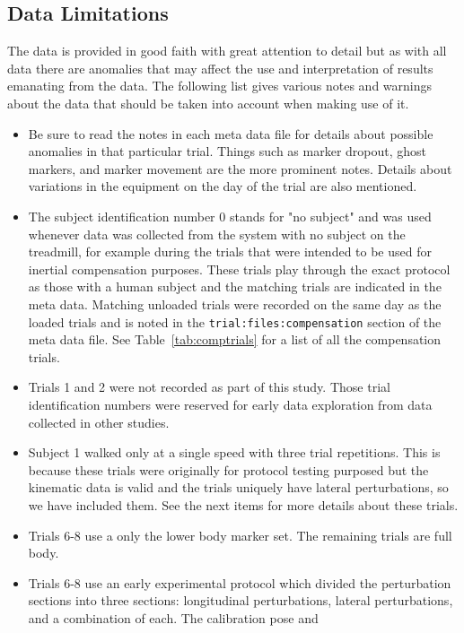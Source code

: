 \documentclass[fleqn,12pt]{wlpeerj}
\begin{document}
\subsection*{Data Limitations}
%
The data is provided in good faith with great attention to detail but as with
all data there are anomalies that may affect the use and interpretation of
results emanating from the data. The following list gives various notes and
warnings about the data that should be taken into account when making use of
it.
%
\begin{itemize}
  \item Be sure to read the notes in each meta data file for details about
    possible anomalies in that particular trial. Things such as marker dropout,
    ghost markers, and marker movement are the more prominent notes. Details
    about variations in the equipment on the day of the trial are also
    mentioned.
  \item The subject identification number 0 stands for "no subject" and was
    used whenever data was collected from the system with no subject on the
    treadmill, for example during the trials that were intended to be used for
    inertial compensation purposes. These trials play through the exact
    protocol as those with a human subject and the matching trials are
    indicated in the meta data. Matching unloaded trials were recorded on the
    same day as the loaded trials and is noted in the
    \verb|trial:files:compensation| section of the meta data file. See
    Table~\ref{tab:comptrials} for a list of all the compensation trials.
  \item Trials 1 and 2 were not recorded as part of this study. Those trial
    identification numbers were reserved for early data exploration from data
    collected in other studies.
  \item Subject 1 walked only at a single speed with three trial repetitions.
    This is because these trials were originally for protocol testing purposed
    but the kinematic data is valid and the trials uniquely have lateral
    perturbations, so we have included them. See the next items for more
    details about these trials.
  \item Trials 6-8 use a only the lower body marker set. The remaining trials
    are full body.
  \item Trials 6-8 use an early experimental protocol which divided the
    perturbation sections into three sections: longitudinal perturbations,
    lateral perturbations, and a combination of each. The calibration pose and

\end{itemize}
\end{document}
